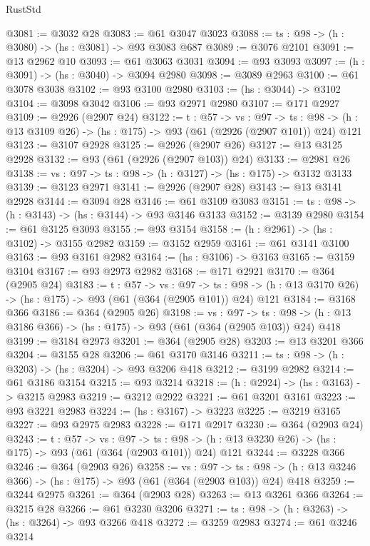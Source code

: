\begin{lexlean}{RustStd}
\begin{coremodule}
@3081 := @3032 @28
@3083 := @61 @3047 @3023
@3088 := {ts : @98} -> (h : @3080) -> (hs : @3081) -> @93 @3083 @687
@3089 := @3076 @2101
@3091 := @13 @2962 @10
@3093 := @61 @3063 @3031
@3094 := @93 @3093
@3097 := (h : @3091) -> (hs : @3040) -> @3094 @2980
@3098 := @3089 @2963
@3100 := @61 @3078 @3038
@3102 := @93 @3100 @2980
@3103 := (hs : @3044) -> @3102
@3104 := @3098 @3042
@3106 := @93 @2971 @2980
@3107 := @171 @2927
@3109 := @2926 (@2907 @24)
@3122 := {t : @57} ->
  {vs : @97} ->
  {ts : @98} -> (h : @13 @3109 @26) -> (hs : @175) -> @93 (@61 (@2926 (@2907 @101)) @24) @121
@3123 := @3107 @2928
@3125 := @2926 (@2907 @26)
@3127 := @13 @3125 @2928
@3132 := @93 (@61 (@2926 (@2907 @103)) @24)
@3133 := @2981 @26
@3138 := {vs : @97} -> {ts : @98} -> (h : @3127) -> (hs : @175) -> @3132 @3133
@3139 := @3123 @2971
@3141 := @2926 (@2907 @28)
@3143 := @13 @3141 @2928
@3144 := @3094 @28
@3146 := @61 @3109 @3083
@3151 := {ts : @98} -> (h : @3143) -> (hs : @3144) -> @93 @3146 @3133
@3152 := @3139 @2980
@3154 := @61 @3125 @3093
@3155 := @93 @3154
@3158 := (h : @2961) -> (hs : @3102) -> @3155 @2982
@3159 := @3152 @2959
@3161 := @61 @3141 @3100
@3163 := @93 @3161 @2982
@3164 := (hs : @3106) -> @3163
@3165 := @3159 @3104
@3167 := @93 @2973 @2982
@3168 := @171 @2921
@3170 := @364 (@2905 @24)
@3183 := {t : @57} ->
  {vs : @97} ->
  {ts : @98} -> (h : @13 @3170 @26) -> (hs : @175) -> @93 (@61 (@364 (@2905 @101)) @24) @121
@3184 := @3168 @366
@3186 := @364 (@2905 @26)
@3198 := {vs : @97} ->
  {ts : @98} -> (h : @13 @3186 @366) -> (hs : @175) -> @93 (@61 (@364 (@2905 @103)) @24) @418
@3199 := @3184 @2973
@3201 := @364 (@2905 @28)
@3203 := @13 @3201 @366
@3204 := @3155 @28
@3206 := @61 @3170 @3146
@3211 := {ts : @98} -> (h : @3203) -> (hs : @3204) -> @93 @3206 @418
@3212 := @3199 @2982
@3214 := @61 @3186 @3154
@3215 := @93 @3214
@3218 := (h : @2924) -> (hs : @3163) -> @3215 @2983
@3219 := @3212 @2922
@3221 := @61 @3201 @3161
@3223 := @93 @3221 @2983
@3224 := (hs : @3167) -> @3223
@3225 := @3219 @3165
@3227 := @93 @2975 @2983
@3228 := @171 @2917
@3230 := @364 (@2903 @24)
@3243 := {t : @57} ->
  {vs : @97} ->
  {ts : @98} -> (h : @13 @3230 @26) -> (hs : @175) -> @93 (@61 (@364 (@2903 @101)) @24) @121
@3244 := @3228 @366
@3246 := @364 (@2903 @26)
@3258 := {vs : @97} ->
  {ts : @98} -> (h : @13 @3246 @366) -> (hs : @175) -> @93 (@61 (@364 (@2903 @103)) @24) @418
@3259 := @3244 @2975
@3261 := @364 (@2903 @28)
@3263 := @13 @3261 @366
@3264 := @3215 @28
@3266 := @61 @3230 @3206
@3271 := {ts : @98} -> (h : @3263) -> (hs : @3264) -> @93 @3266 @418
@3272 := @3259 @2983
@3274 := @61 @3246 @3214

\end{coremodule}
\end{lexlean}
